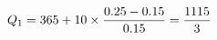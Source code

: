 \documentclass[preview]{standalone}
\begin{document}
\begin{align*}
\special{dvisvgm:raw <g id='unique000'>}Q_1=365+10\times\frac{0.25-0.15}{0.15}=\frac{1115}{3}\special{dvisvgm:raw </g>}
\end{align*}
\end{document}
